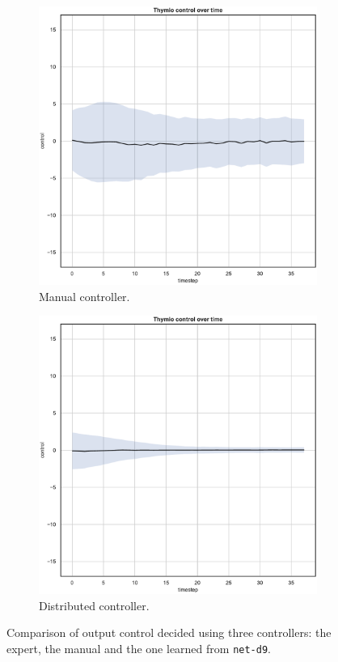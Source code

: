 \begin{figure}[!htb]
\begin{subfigure}[h]{0.3\textwidth}
		\includegraphics[width=\textwidth]{contents/images/net-d9/control-overtime-manual}%
		\caption{Manual controller.}
	\end{subfigure}
	\hfill
	\begin{subfigure}[h]{0.3\textwidth}
		\centering
		\includegraphics[width=\textwidth]{contents/images/net-d9/control-overtime-learned_distributed}
		\caption{Distributed controller.}
	\end{subfigure}
	\caption[Evaluation of the control decided by \texttt{net-d9}.]{Comparison 
		of output control decided using three controllers: the expert, the manual 
		and the one learned from \texttt{net-d9}.}
	\label{fig:net-d9control}
\end{figure}

